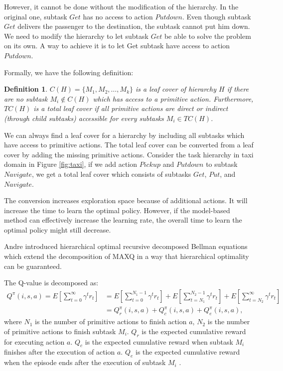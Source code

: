 \documentclass{article} %
\newtheorem{definition}{Definition}
\begin{document}
However, it cannot be done without the modification of the hierarchy. In the original one, 
subtask $Get$ has no access to action $Putdown$. Even though subtask $Get$ delivers the passenger to the destination,
the subtask cannot put him down. We need to modify the hierarchy to let subtask $Get$ be
able to solve the problem on its own. A way to achieve it is to let Get subtask have access
to action $Putdown$. 

Formally, we have the following definition:
\begin{definition}
    $C(H) = \{M_1, M_2, \dots, M_k\}$ is a leaf cover of hierarchy $H$ 
    if there are no subtask $M_i \notin C(H)$ which has access to a primitive action.
    Furthermore, $TC(H)$ is a total leaf cover if all primitive actions are direct or indirect (through child subtasks) accessible for every 
    subtasks $M_i \in TC(H)$.
\end{definition}

We can always find a leaf cover for a hierarchy by including all subtasks which have access
to primitive actions. The total leaf cover can be converted from a leaf cover by
adding the missing primitive actions.
Consider the task hierarchy in taxi domain in Figure \ref{fig:taxi},
if we add action $Pickup$ and $Putdown$ to subtask $Navigate$, 
we get a total leaf cover which consists of subtasks $Get$, $Put$, and $Navigate$.

The conversion increases exploration space because of additional actions. It will increase 
the time to learn the optimal policy. However, if the model-based method can effectively increase
the learning rate, the overall time to learn the optimal policy might still decrease.

Andre \cite{HORDQ} introduced hierarchical optimal recursive decomposed Bellman equations
which extend the decomposition of MAXQ in a way that hierarchical optimality
can be guaranteed.

The Q-value is decomposed as:
\begin{align}
    \label{eq:HordQ}
    Q^{\pi}(i, s, a) = E[\sum_{t=0}^{\infty}\gamma^t r_t] &= E[\sum_{t=0}^{N_1 - 1}\gamma^t r_t] + E[\sum_{t=N_1}^{N_2 - 1}\gamma^t r_t] + E[\sum_{t=N_2}^{\infty}\gamma^t r_t]\\
                    &= Q_r^{\pi}(i, s, a) + Q_c^{\pi}(i, s, a) + Q_e^{\pi}(i, s, a),
\end{align}
where $N_1$ is the number of primitive actions to finish action $a$, $N_2$ is the number of primitive actions 
to finish subtask $M_i$. $Q_r$ is the expected cumulative reward for executing action $a$.
$Q_c$ is the expected cumulative reward when subtask $M_i$ finishes after the execution of action $a$. 
$Q_e$ is the expected cumulative reward when the episode ends after the execution of subtask $M_i$ .
\end{document}
